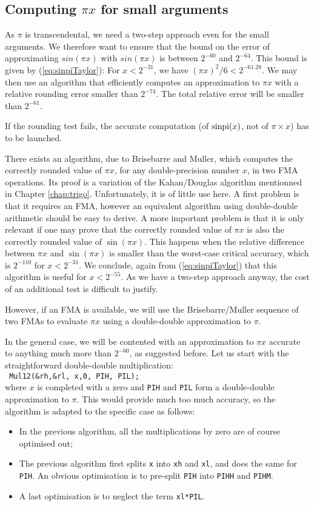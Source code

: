 \subsection{Computing $\pi x$ for small arguments}
As $\pi$ is transcendental, we need a two-step approach even for the
small arguments.  We therefore want to ensure that the bound on the
error of approximating $sin(\pi x)$ with $sin(\pi x)$ is between
$2^{-60}$ and $2^{-64}$.  This bound is given by
(\ref{eq:sinpiTaylor}): For $x<2^{-31}$, we have $(\pi x)^2/6
<2^{-61.28}$.  We may then use an algorithm that efficiently computes
an approximation to $\pi x$ with a relative rounding error smaller
than $2^{-74}$. The total relative error will be smaller than
$2^{-61}$.

If the rounding test fails, the accurate computation (of $\operatorname{sinpi}(x)$,
not of $\pi\times x$) has to be launched.

There exists an algorithm, due to Brisebarre and Muller, which
computes the correctly rounded value of $\pi x$, for any
double-precision number $x$, in two FMA operations.  Its proof is a
variation of the Kahan/Douglas algorithm mentionned in Chapter
\ref{chap:trigo}. Unfortunately, it is of little use here. A first
problem is that it requires an FMA, however an equivalent algorithm
using double-double arithmetic should be easy to derive. A more
important problem is that it is only relevant if one may prove that
the correctly rounded value of $\pi x$ is also the correctly rounded
value of $\sin(\pi x)$. This happens when the relative difference
between $\pi x$ and $\sin(\pi x)$ is smaller than the worst-case
critical accuracy, which is $2^{-110}$ for
$x<2^{-31}$. We conclude, again from (\ref{eq:sinpiTaylor}) that this
algorithm is useful for $x<2^{-55}$.
As we have a two-step approach anyway, the cost of an additional test
is difficult to justify. 

However, if an FMA is available, we will use the Brisebarre/Muller sequence of two
FMAs to evaluate $\pi x$ using  a double-double
approximation to $\pi$.

In the general case, we will be contented with an approximation to
$\pi x$ accurate to anything much more than $2^{-60}$, as suggested
before. Let us start with the straightforward double-double multiplication:\\
\texttt{ Mul12(\&rh,\&rl, x,0, PIH, PIL);}\\
where $x$ is completed with a zero and \texttt{PIH} and \texttt{PIL}
form a double-double approximation to $\pi$. This would provide much
too much accuracy, so the algorithm is adapted to the specific case as
follows:
\begin{itemize}
\item In the previous algorithm, all the multiplications by zero are of course optimised out;
\item The previous algorithm first splits \texttt{x} into \texttt{xh}
  and \texttt{xl}, and does the same for \texttt{PIH}. An obvious
  optimisation is to pre-split \texttt{PIH} into \texttt{PIHH} and
  \texttt{PIHM}.
\item A last optimisation is to neglect the term \texttt{xl*PIL}.
\end{itemize}

